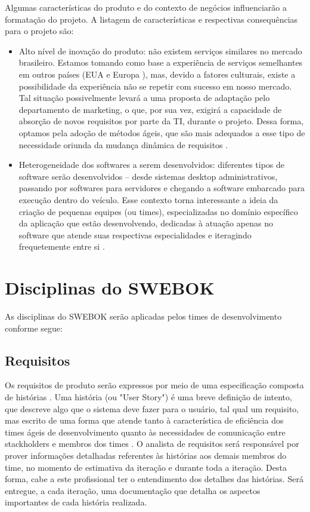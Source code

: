\documentclass[12pt,journal,compsoc]{IEEEtran}
\begin{document}
Algumas características do produto e do contexto de negócios influenciarão a formatação do projeto. A listagem de características e respectivas consequências para o projeto são:

\begin{itemize}

\item Alto nível de inovação do produto: não existem serviços similares no mercado brasileiro. Estamos tomando como base a experiência de serviços semelhantes em outros países (EUA e Europa \cite{car2go_locations}), mas, devido a fatores culturais, existe a possibilidade da experiência não se repetir com sucesso em nosso mercado. Tal situação possivelmente levará a uma proposta de adaptação pelo departamento de marketing, o que, por sua vez, exigirá a capacidade de absorção de novos requisitos por parte da TI, durante o projeto. Dessa forma, optamos pela adoção de métodos ágeis, que são mais adequados a esse tipo de necessidade oriunda da mudança dinâmica de requisitos \cite{cao_ramesh_2008}.

\item Heterogeneidade dos softwares a serem desenvolvidos: diferentes tipos de software serão desenvolvidos -- desde sistemas desktop administrativos, passando por softwares para servidores e chegando a software embarcado para execução dentro do veículo. Esse contexto torna interessante a ideia da criação de pequenas equipes (ou times), especializadas no domínio específico da aplicação que estão desenvolvendo, dedicadas à atuação apenas no software que atende suas respectivas especialidades e iteragindo frequetemente entre si \cite{backmann_nord_ozkaya_2012}.

\end{itemize}

\section{Disciplinas do SWEBOK}

As disciplinas do SWEBOK serão aplicadas pelos times de desenvolvimento conforme segue: 

\subsection{Requisitos}

Os requisitos de produto serão expressos por meio de uma especificação composta de histórias \cite{primo_user_2011}. Uma história (ou "User Story") é uma breve definição de intento, que descreve algo que o sistema deve fazer para o usuário, tal qual um requisito, mas escrito de uma forma que atende tanto à característica de eficiência dos times ágeis de desenvolvimento quanto às necessidades de comunicação entre stackholders e membros dos times \cite{agile_sw_requirements}. O analista de requisitos será responsável por prover informações detalhadas referentes às histórias aos demais membros do time, no momento de estimativa da iteração e durante toda a iteração. Desta forma, cabe a este profissional ter o entendimento dos detalhes das histórias. Será entregue, a cada iteração, uma documentação que detalha os aspectos importantes de cada história realizada. 
\end{document}
